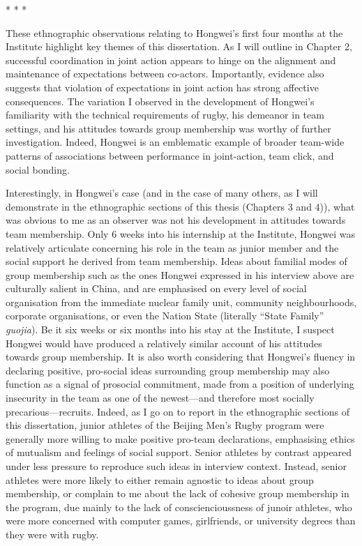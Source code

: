 \begin{center}
  * * *
\end{center}

These ethnographic observations relating to Hongwei's first four months at the Institute highlight key themes of this dissertation.  As I will outline in Chapter 2, successful coordination in joint action appears to hinge on the alignment and maintenance of expectations between co-actors.  Importantly, evidence also suggests that violation of expectations in joint action has strong affective consequences.  The variation I observed in the development of Hongwei's familiarity with the technical requirements of rugby, his demeanor in team settings, and his attitudes towards group membership was worthy of further investigation.  Indeed, Hongwei is an emblematic example of broader team-wide patterns of associations between performance in joint-action, team click, and social bonding.

Interestingly, in Hongwei's case (and in the case of many others, as I will demonstrate in the ethnographic sections of this thesis (Chapters 3 and 4)), what was obvious to me as an observer was not his development in attitudes towards team membership.  Only 6 weeks into his internship at the Institute, Hongwei was relatively articulate concerning his role in the team as junior member and the social support he derived from team membership.  Ideas about familial modes of group membership such as the ones Hongwei expressed in his interview above are culturally salient in China, and are emphasised on every level of social organisation from the immediate nuclear family unit, community neighbourhoods, corporate organisations, or even the Nation State (literally ``State Family'' \textit{guojia}). Be it six weeks or six months into his stay at the Institute, I suspect Hongwei would have produced a relatively similar account of his attitudes towards group membership.  It is also worth considering that Hongwei's fluency in declaring positive, pro-social ideas surrounding group membership may also function as a  signal of prosocial commitment, made from a position of underlying insecurity in the team as one of the newest---and therefore most socially precarious---recruits.  Indeed, as I go on to report in the ethnographic sections of this dissertation, junior athletes of the Beijing Men's Rugby program were generally more willing to make positive pro-team declarations, emphasising ethics of mutualism and feelings of social support. Senior athletes by contrast appeared under less pressure to reproduce such ideas in interview context. Instead, senior athletes were more likely to either remain agnostic to ideas about group membership, or complain to me about the lack of cohesive group membership in the program, due mainly to the lack of consciencioussness of junoir athletes, who were more concerned with computer games, girlfriends, or university degrees than they were with rugby.

